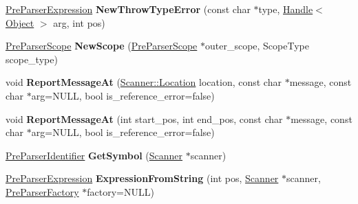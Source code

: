 \begin{DoxyCompactItemize}
\item 
\hypertarget{classv8_1_1internal_1_1_pre_parser_traits_a7608f663f1484c179b8eafff657f72ba}{}\hyperlink{classv8_1_1internal_1_1_pre_parser_expression}{Pre\+Parser\+Expression} {\bfseries New\+Throw\+Type\+Error} (const char $\ast$type, \hyperlink{classv8_1_1internal_1_1_handle}{Handle}$<$ \hyperlink{classv8_1_1internal_1_1_object}{Object} $>$ arg, int pos)\label{classv8_1_1internal_1_1_pre_parser_traits_a7608f663f1484c179b8eafff657f72ba}

\item 
\hypertarget{classv8_1_1internal_1_1_pre_parser_traits_a470c9a07a422963a1c1ef62b6025bcc2}{}\hyperlink{classv8_1_1internal_1_1_pre_parser_scope}{Pre\+Parser\+Scope} {\bfseries New\+Scope} (\hyperlink{classv8_1_1internal_1_1_pre_parser_scope}{Pre\+Parser\+Scope} $\ast$outer\+\_\+scope, Scope\+Type scope\+\_\+type)\label{classv8_1_1internal_1_1_pre_parser_traits_a470c9a07a422963a1c1ef62b6025bcc2}

\item 
\hypertarget{classv8_1_1internal_1_1_pre_parser_traits_abf7624f17d78caf0405c33654b8264e1}{}void {\bfseries Report\+Message\+At} (\hyperlink{structv8_1_1internal_1_1_scanner_1_1_location}{Scanner\+::\+Location} location, const char $\ast$message, const char $\ast$arg=N\+U\+L\+L, bool is\+\_\+reference\+\_\+error=false)\label{classv8_1_1internal_1_1_pre_parser_traits_abf7624f17d78caf0405c33654b8264e1}

\item 
\hypertarget{classv8_1_1internal_1_1_pre_parser_traits_ab7355a555a6e30d5c2ebe32e1d46fc60}{}void {\bfseries Report\+Message\+At} (int start\+\_\+pos, int end\+\_\+pos, const char $\ast$message, const char $\ast$arg=N\+U\+L\+L, bool is\+\_\+reference\+\_\+error=false)\label{classv8_1_1internal_1_1_pre_parser_traits_ab7355a555a6e30d5c2ebe32e1d46fc60}

\item 
\hypertarget{classv8_1_1internal_1_1_pre_parser_traits_a8cfb581297a9136904db31925e361f3a}{}\hyperlink{classv8_1_1internal_1_1_pre_parser_identifier}{Pre\+Parser\+Identifier} {\bfseries Get\+Symbol} (\hyperlink{classv8_1_1internal_1_1_scanner}{Scanner} $\ast$scanner)\label{classv8_1_1internal_1_1_pre_parser_traits_a8cfb581297a9136904db31925e361f3a}

\item 
\hypertarget{classv8_1_1internal_1_1_pre_parser_traits_a1ccbffc910f113613cdb48aeef0a8a7b}{}\hyperlink{classv8_1_1internal_1_1_pre_parser_expression}{Pre\+Parser\+Expression} {\bfseries Expression\+From\+String} (int pos, \hyperlink{classv8_1_1internal_1_1_scanner}{Scanner} $\ast$scanner, \hyperlink{classv8_1_1internal_1_1_pre_parser_factory}{Pre\+Parser\+Factory} $\ast$factory=N\+U\+L\+L)\label{classv8_1_1internal_1_1_pre_parser_traits_a1ccbffc910f113613cdb48aeef0a8a7b}


\end{DoxyCompactItemize}
